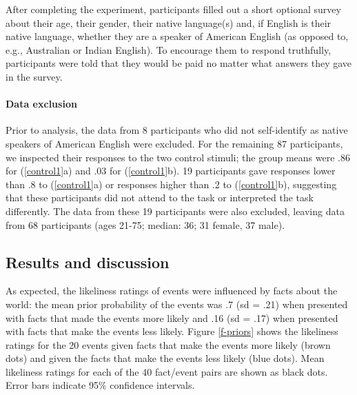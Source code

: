 \documentclass[11pt,fleqn]{article}
\newcommand{\6}{\mbox{$[\hspace*{-.6mm}[$}}
\newcommand{\9}{\mbox{$]\hspace*{-.6mm}]$}}
\begin{document}
After completing the experiment, participants filled out a short optional survey about their age, their gender, their native language(s) and, if English is their native language, whether they are a speaker of American English (as opposed to, e.g., Australian or Indian English). To encourage them to respond truthfully, participants were told that they would be paid no matter what answers they gave in the survey. 

\paragraph{Data exclusion}
Prior to analysis, the data from 8 participants who did not self-identify as native speakers of American English were excluded. For the remaining 87 participants, we inspected their responses to the two control stimuli; the group means were .86 for (\ref{control1}a) and .03 for (\ref{control1}b). 19 participants gave responses lower than .8 to (\ref{control1}a) or responses higher than .2 to (\ref{control1}b), suggesting that these participants did not attend to the task or interpreted the task differently. The data from these 19 participants were also excluded, leaving data from 68 participants (ages 21-75; median: 36; 31 female, 37 male).  


\subsection{Results and discussion}

As expected, the likeliness ratings of events were influenced by facts about the world: the mean prior probability of the events was .7 (sd = .21) when presented with facts that made the events more likely and .16 (sd = .17) when presented with facts that make the events less likely. Figure \ref{f-priors} shows the likeliness ratings for the 20 events given facts that make the events more likely (brown dots) and given the facts that make the events less likely (blue dots). Mean likeliness ratings for each of the 40 fact/event pairs are shown as black dots. Error bars indicate 95\% confidence intervals.
\end{document}
